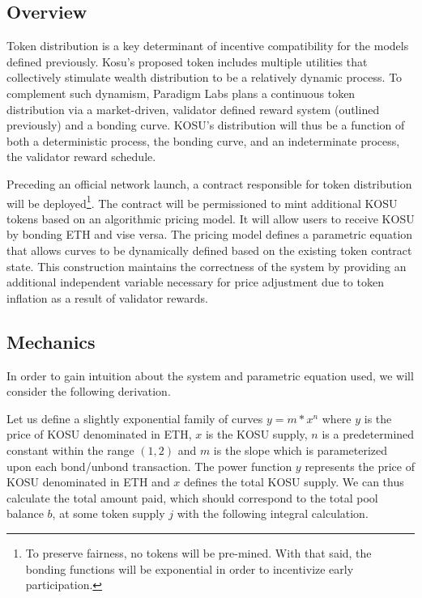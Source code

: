 \documentclass[10pt]{article}
\begin{document}
\subsection{Overview}\label{token-distribution-overview}
Token distribution is a key determinant of incentive compatibility for the models defined previously. Kosu’s proposed token includes multiple utilities that collectively stimulate wealth distribution to be a relatively dynamic process. To complement such dynamism, Paradigm Labs plans a continuous token distribution via a market-driven, validator defined reward system (outlined previously) and a bonding curve. KOSU’s distribution will thus be a function of both a deterministic process, the bonding curve, and an indeterminate process, the validator reward schedule.
\medskip

Preceding an official network launch, a contract responsible for token distribution will be deployed\footnote{To preserve fairness, no tokens will be pre-mined. With that said, the bonding functions will be exponential in order to incentivize early participation.}. The contract will be permissioned to mint additional KOSU tokens based on an algorithmic pricing model. It will allow users to receive KOSU by bonding ETH and vise versa. The pricing model defines a parametric equation that allows curves to be dynamically defined based on the existing token contract state. This construction maintains the correctness of the system by providing an additional independent variable necessary for price adjustment due to token inflation as a result of validator rewards.

\subsection{Mechanics}\label{token-distribution-mechanics}
In order to gain intuition about the system and parametric equation used, we will consider the following derivation.
\medskip

Let us define a slightly exponential family of curves $ y = m*x^n $ where $y$ is the price of KOSU denominated in ETH, $x$ is the KOSU supply, $n$ is a predetermined constant within the range $(1,2)$ and $m$ is the slope which is parameterized upon each bond/unbond transaction. The power function $y$ represents the price of KOSU denominated in ETH and $x$ defines the total KOSU supply. We can thus calculate the total amount paid, which should correspond to the total pool balance $b$, at some token supply $j$ with the following integral calculation.
\end{document}
